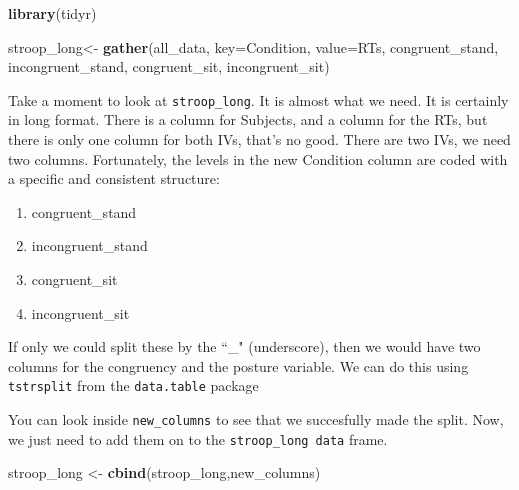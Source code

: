\documentclass[]{book}
\newenvironment{Shaded}{\begin{snugshade}}{\end{snugshade}}
\newcommand{\KeywordTok}[1]{\textcolor[rgb]{0.13,0.29,0.53}{\textbf{#1}}}
\newcommand{\DataTypeTok}[1]{\textcolor[rgb]{0.13,0.29,0.53}{#1}}
\newcommand{\StringTok}[1]{\textcolor[rgb]{0.31,0.60,0.02}{#1}}
\newcommand{\OperatorTok}[1]{\textcolor[rgb]{0.81,0.36,0.00}{\textbf{#1}}}
\newcommand{\NormalTok}[1]{#1}
\providecommand{\tightlist}{%
  \setlength{\itemsep}{0pt}\setlength{\parskip}{0pt}}
\begin{document}
\begin{Shaded}
\begin{Highlighting}[]
\KeywordTok{library}\NormalTok{(tidyr)}

\NormalTok{stroop_long<-}\StringTok{ }\KeywordTok{gather}\NormalTok{(all_data, }\DataTypeTok{key=}\NormalTok{Condition, }\DataTypeTok{value=}\NormalTok{RTs, }
\NormalTok{                     congruent_stand, incongruent_stand,}
\NormalTok{                     congruent_sit, incongruent_sit)}
\end{Highlighting}
\end{Shaded}

Take a moment to look at \texttt{stroop\_long}. It is almost what we
need. It is certainly in long format. There is a column for Subjects,
and a column for the RTs, but there is only one column for both IVs,
that's no good. There are two IVs, we need two columns. Fortunately, the
levels in the new Condition column are coded with a specific and
consistent structure:

\begin{enumerate}
\def\labelenumi{\arabic{enumi}.}
\tightlist
\item
  congruent\_stand
\item
  incongruent\_stand
\item
  congruent\_sit
\item
  incongruent\_sit
\end{enumerate}

If only we could split these by the ``\_" (underscore), then we would
have two columns for the congruency and the posture variable. We can do
this using \texttt{tstrsplit} from the \texttt{data.table} package

\begin{Shaded}
\end{Shaded}

You can look inside \texttt{new\_columns} to see that we succesfully
made the split. Now, we just need to add them on to the
\texttt{stroop\_long\ data} frame.

\begin{Shaded}
\begin{Highlighting}[]
\NormalTok{stroop_long <-}\StringTok{ }\KeywordTok{cbind}\NormalTok{(stroop_long,new_columns)}
\end{Highlighting}
\end{Shaded}
\end{document}
